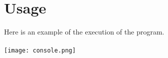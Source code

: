 \section{Usage}
\label{sec:Usage}
	Here is an example of the execution of the program. \\~\\
	\texttt{[image: console.png]} 
